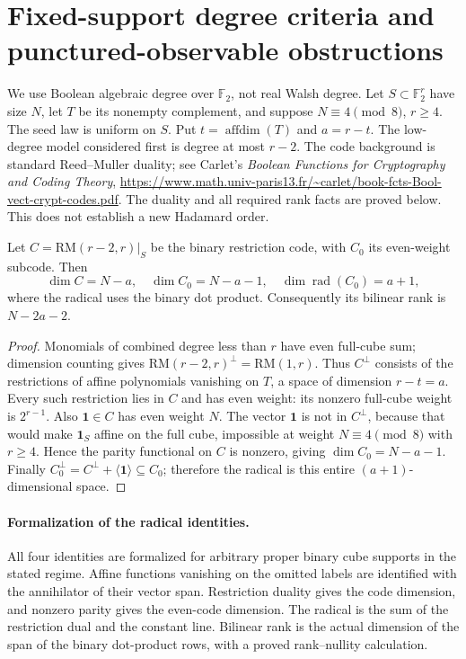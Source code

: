 \section{Fixed-support degree criteria and punctured-observable obstructions}
\label{s21:sec:nonlinear-fixed-support}
We use Boolean algebraic degree over $\mathbb F_2$, not real Walsh degree.
Let $S\subset\mathbb F_2^r$ have size $N$, let $T$ be its nonempty
complement, and suppose $N\equiv4\pmod8$, $r\ge4$. The seed law is
uniform on $S$. Put $t=\operatorname{affdim}(T)$ and $a=r-t$.
The low-degree model considered first is degree at most $r-2$.
The code background is standard Reed--Muller duality; see Carlet's
\emph{Boolean Functions for Cryptography and Coding Theory},
\url{https://www.math.univ-paris13.fr/~carlet/book-fcts-Bool-vect-crypt-codes.pdf}.
The duality and all required rank facts are proved below. This does not establish a new Hadamard order.

\begin{lemma}
\label{s21:lem:nonlinear-radical}
Let $C=\mathrm{RM}(r-2,r)|_S$ be the binary restriction code, with
$C_0$ its even-weight subcode. Then
\[
 \dim C=N-a,\quad \dim C_0=N-a-1,\quad
 \dim\operatorname{rad}(C_0)=a+1,
\]
where the radical uses the binary dot product. Consequently its bilinear
rank is $N-2a-2$.
\end{lemma}
\begin{proof}
Monomials of combined degree less than $r$ have even full-cube sum;
dimension counting gives $\mathrm{RM}(r-2,r)^\perp=\mathrm{RM}(1,r)$.
Thus $C^\perp$ consists of the restrictions of affine polynomials
vanishing on $T$, a space of dimension $r-t=a$. Every such restriction
lies in $C$ and has even weight: its nonzero full-cube weight is $2^{r-1}$.
Also $\mathbf1\in C$ has even weight $N$.
The vector $\mathbf1$ is not in $C^\perp$, because that would make
$\mathbf1_S$ affine on the full cube, impossible at weight
$N\equiv4\pmod8$ with $r\ge4$. Hence the parity functional on $C$ is
nonzero, giving $\dim C_0=N-a-1$. Finally
$C_0^\perp=C^\perp+\langle\mathbf1\rangle\subseteq C_0$;
therefore the radical is this entire $(a+1)$-dimensional space.
\end{proof}

\paragraph{Formalization of the radical identities.}
All four identities are formalized for arbitrary proper binary cube
supports in the stated regime. Affine functions vanishing on the omitted
labels are identified with the annihilator of their vector span.
Restriction duality gives the code dimension, and nonzero parity gives
the even-code dimension. The radical is the sum of the restriction dual
and the constant line. Bilinear rank is the actual dimension of the span
of the binary dot-product rows, with a proved rank--nullity calculation.

